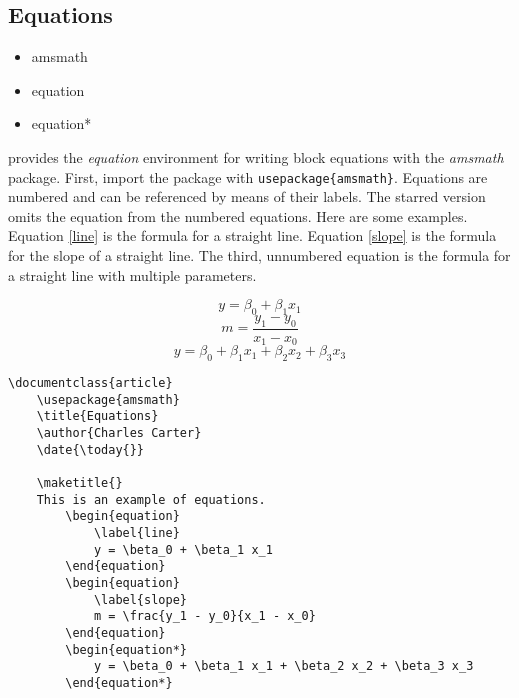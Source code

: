         \subsection{Equations}
        \label{Equations}
        
        \begin{framed}
            \begin{itemize}
                \item{amsmath}
                \item{equation}
                \item{equation*}
            \end{itemize}
        \end{framed}
	
		\LaTeXe{} provides the \textit{equation} environment for writing block equations with the \textit{amsmath} package. First, import the package with \texttt{usepackage\{amsmath\}}.  Equations are numbered and can be referenced by means of their labels. The starred version omits the equation from the numbered equations. Here are some examples. Equation \ref{line} is the formula for a straight line. Equation \ref{slope} is the formula for the slope of a straight line.  The third, unnumbered equation is the formula for a straight line with multiple parameters.

		\begin{equation}
			\label{line}
			y = \beta_0 + \beta_1 x_1
		\end{equation}
		\begin{equation}
			\label{slope}
			m = \frac{y_1 - y_0}{x_1 - x_0}
		\end{equation}
		\begin{equation*}
			y = \beta_0 + \beta_1 x_1 + \beta_2 x_2 + \beta_3 x_3
		\end{equation*}

        \begin{verbatim}
\documentclass{article}
	\usepackage{amsmath}
    \title{Equations}
    \author{Charles Carter}
    \date{\today{}}
 
    \maketitle{}
	This is an example of equations.
		\begin{equation}
			\label{line}
			y = \beta_0 + \beta_1 x_1
		\end{equation}
		\begin{equation}
			\label{slope}
			m = \frac{y_1 - y_0}{x_1 - x_0}
		\end{equation}
		\begin{equation*}
			y = \beta_0 + \beta_1 x_1 + \beta_2 x_2 + \beta_3 x_3
		\end{equation*}
	    
        \end{verbatim}

